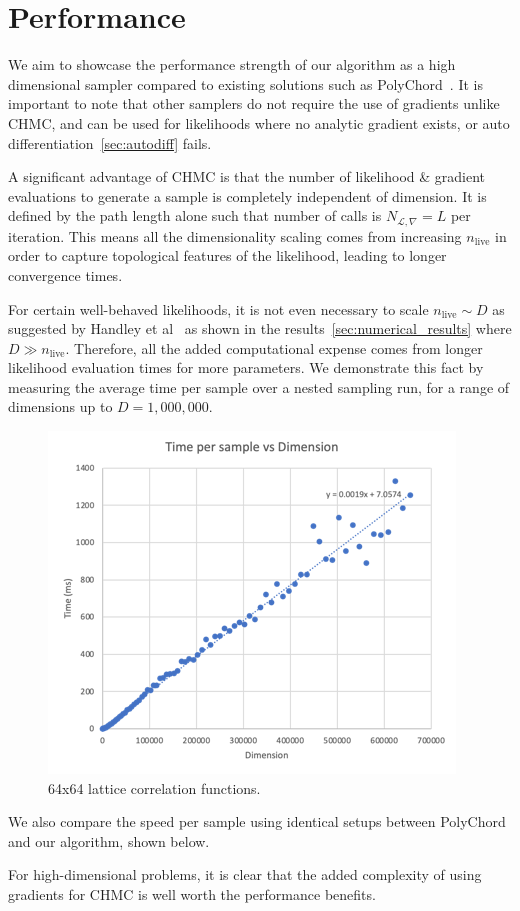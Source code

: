 \documentclass[11pt]{article}
\begin{document}
\section{Performance}\label{sec:performance}
    We aim to showcase the performance strength of our algorithm as a high dimensional sampler compared to existing
    solutions such as PolyChord~\cite{Handley_2015}.
    It is important to note that other samplers do not require the use of gradients unlike CHMC, and can be used for
    likelihoods where no analytic gradient exists, or auto differentiation~\eqref{sec:autodiff} fails.

    A significant advantage of CHMC is that the number of likelihood \& gradient evaluations to generate a sample is
    completely independent of dimension.
    It is defined by the path length alone such that number of calls is $N_{\mathcal{L}, \nabla} = L$ per iteration.
    This means all the dimensionality scaling comes from increasing $n_{\text{live}}$ in order to capture topological
    features of the likelihood, leading to longer convergence times.

    For certain well-behaved likelihoods, it is not even necessary to scale $n_{\text{live}} \sim D$ as suggested by
    Handley et al~\cite{Handley_2015} as shown in the results~\eqref{sec:numerical_results} where $D \gg n_{\text{live}}$.
    Therefore, all the added computational expense comes from longer likelihood evaluation times for more parameters.
    We demonstrate this fact by measuring the average time per sample over a nested sampling run, for a range of
    dimensions up to $D = 1,000,000$.

    \begin{figure}[t!]
        \center
        \includegraphics[width=\linewidth]{../figures/Performance}
        \caption{
            64x64 lattice correlation functions.
        }\label{fig:performance}
    \end{figure}

    We also compare the speed per sample using identical setups between PolyChord and our algorithm, shown below.

    For high-dimensional problems, it is clear that the added complexity of using gradients for CHMC is well worth the
    performance benefits.
\end{document}

